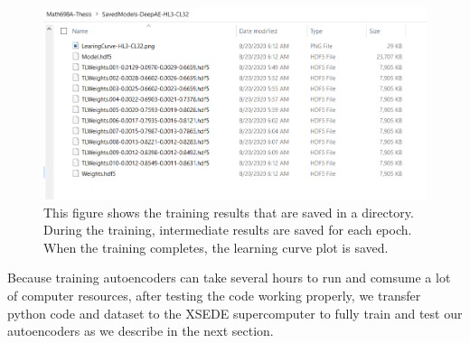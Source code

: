 \documentclass{article}
\begin{document}
\begin{figure}[h!]
	\includegraphics[width=1\linewidth]{training-results.png}
	\caption{This figure shows the training results that are saved in a directory. During the training, intermediate results are saved for each epoch. When the training completes, the learning curve plot is saved.}
	\label{fig:training-results}
\end{figure} 

Because training autoencoders can take several hours to run and comsume a lot of computer resources, after testing the code working properly, we transfer python code and dataset to the XSEDE supercomputer to fully train and test our autoencoders as we describe in the next section.
\end{document}
